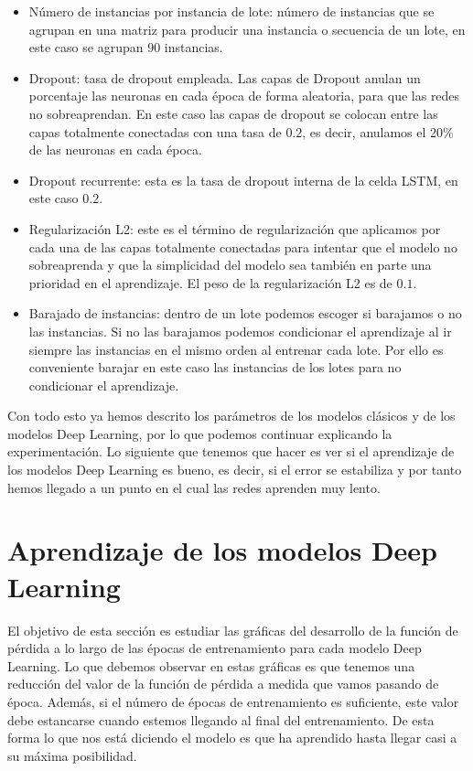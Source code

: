 \begin{itemize}
	\item Número de instancias por instancia de lote: número de instancias que se agrupan en una matriz para producir una instancia o secuencia de un lote, en este caso se agrupan 90 instancias.
	\item Dropout: tasa de dropout empleada. Las capas de Dropout anulan un porcentaje las neuronas en cada época de forma aleatoria, para que las redes no sobreaprendan. En este caso las capas de dropout se colocan entre las capas totalmente conectadas con una tasa de $0.2$, es decir, anulamos el 20\% de las neuronas en cada época.
	\item Dropout recurrente: esta es la tasa de dropout interna de la celda LSTM, en este caso $0.2$.
	\item Regularización L2: este es el término de regularización que aplicamos por cada una de las capas totalmente conectadas para intentar que el modelo no sobreaprenda y que la simplicidad del modelo sea también en parte una prioridad en el aprendizaje. El peso de la regularización L2 es de $0.1$.
	\item Barajado de instancias: dentro de un lote podemos escoger si barajamos o no las instancias. Si no las barajamos podemos condicionar el aprendizaje al ir siempre las instancias en el mismo orden al entrenar cada lote. Por ello es conveniente barajar en este caso las instancias de los lotes para no condicionar el aprendizaje.
\end{itemize}

Con todo esto ya hemos descrito los parámetros de los modelos clásicos y de los modelos Deep Learning, por lo que podemos continuar explicando la experimentación. Lo siguiente que tenemos que hacer es ver si el aprendizaje de los modelos Deep Learning es bueno, es decir, si el error se estabiliza y por tanto hemos llegado a un punto en el cual las redes aprenden muy lento.

\section{Aprendizaje de los modelos Deep Learning}

El objetivo de esta sección es estudiar las gráficas del desarrollo de la función de pérdida a lo largo de las épocas de entrenamiento para cada modelo Deep Learning. Lo que debemos observar en estas gráficas es que tenemos una reducción del valor de la función de pérdida a medida que vamos pasando de época. Además, si el número de épocas de entrenamiento es suficiente, este valor debe estancarse cuando estemos llegando al final del entrenamiento. De esta forma lo que nos está diciendo el modelo es que ha aprendido hasta llegar casi a su máxima posibilidad.

